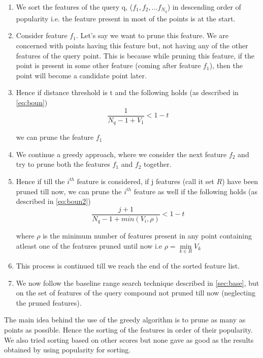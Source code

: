 \begin{enumerate}
	\item We sort the features of the query q, ($f_1,f_2,...f_{N_q}$) in descending order of popularity i.e. the feature present in most of the points is at the start.
	
	\item Consider feature $f_1$. Let's say we want to prune this feature. We are concerned with points having this feature but, not having any of the other features of the query point. This is because while pruning this feature, if the point is present in some other feature (coming after feature $f_1$), then the point will become a candidate point later. 
	
	\item Hence if  distance threshold is t and the following holds (as described in \autoref{eq:boun}) 
	\begin{equation}
	\frac{1}{N_q - 1 + V_{1}}  < 1-t
	\end{equation}
	
we can prune the feature $f_1$		
	
	\item We continue a greedy approach, where we consider the next feature $f_2$ and try to prune both the features $f_1$ and $f_2$ together.
	
	\item Hence if till the $i^{th}$ feature is considered, if j features (call it set $R$) have been pruned till now, we can prune the $i^{th}$ feature as well if the following holds (as described in \autoref{eq:boun2})
	\begin{equation}
	\label{eq: greedy}
	\frac{j+1}{N_q - 1 + min(V_{i}, \rho)} < 1-t 
	\end{equation}
	
where 	$\rho$ is the minimum  number of features present in any point containing atleast one of the features pruned until now i.e $\rho = \min\limits_{k\in R} V_k$

	\item This process is continued till we reach the end of the sorted feature list.
	
	\item We now follow the baseline range search technique described in \autoref{sec:base}, but on the set of features of the query compound not pruned till now (neglecting the pruned features).
	
\end{enumerate}

The main idea behind the use of the greedy algorithm is to prune as many as points as possible. Hence the sorting of the features in order of their popularity. We also tried sorting based on other scores but none gave as good as the results obtained by using popularity for sorting. 

